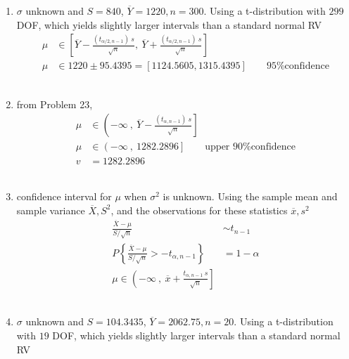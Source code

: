 \begin{enumerate}
	
	\item $ \sigma $ unknown and $ S = 840 $, $ \overline{Y} = 1220, n = 300$. Using a t-distribution with $ 299 $ DOF, which yields slightly larger intervals than a standard normal RV\\
	
		\begin{align}
			\mu &\in \left[ \overline{Y} - \frac{(t_{\alpha/2, n-1})\ s}{\sqrt{n}}, \ \overline{Y} + \frac{(t_{\alpha/2, n-1})\ s}{\sqrt{n}} \right] \nonumber \\
			\mu &\in 1220 \pm 95.4395 = [1124.5605, 1315.4395] \qquad \text{95\% confidence} 
		\end{align}\\
	
	
	\item from Problem 23,\\
	
		\begin{align}
			\mu &\in \left(-\infty\ ,\  \overline{Y} - \frac{(t_{\alpha, n-1})\ s}{\sqrt{n}} \right] \nonumber \\
			\mu &\in \left(-\infty\ ,\ 1282.2896  \right] \qquad \text{upper 90\% confidence} \nonumber \\
			v &= 1282.2896
		\end{align}\\
	
	
	\item confidence interval for $ \mu $ when $ \sigma^2 $ is unknown. Using the sample mean and sample variance $ \overline{X}, S^2 $, and the observations for these statistics $ \overline{x}, s^2 $\\
	
		\begin{align}
			\frac{\overline{X} - \mu}{S/\sqrt{n}} &\sim t_{n-1} \nonumber \\
			P \left\{ \frac{\overline{X} - \mu}{S/\sqrt{n}} > -t_{\alpha, n-1}\right\} &= 1 - \alpha \nonumber \\
			\mu \in \left( -\infty\ ,\ \overline{x} + \frac{t_{\alpha, n-1}\ s}{\sqrt{n}} \right]
		\end{align}\\
	
	
	\item $ \sigma $ unknown and $ S = 104.3435 $, $ \overline{Y} = 2062.75, n = 20$. Using a t-distribution with $ 19 $ DOF, which yields slightly larger intervals than a standard normal RV\\
	

\end{enumerate}
